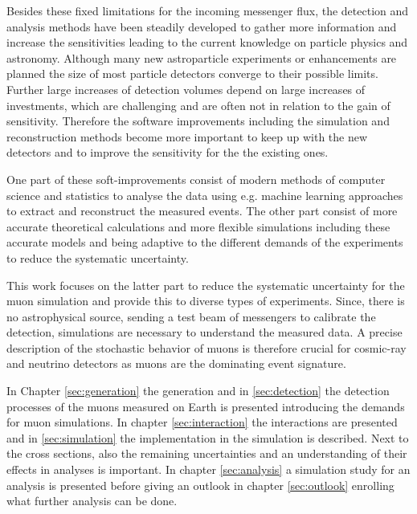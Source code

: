 Besides these fixed limitations for the incoming messenger flux, the detection and analysis methods have been steadily developed to gather more information and increase the sensitivities leading to the current knowledge on particle physics and astronomy.
Although many new astroparticle experiments or enhancements are planned the size of most particle detectors converge to their possible limits.
Further large increases of detection volumes depend on large increases of investments, which are challenging and are often not in relation to the gain of sensitivity.
Therefore the software improvements including the simulation and reconstruction methods become more important to keep up with the new detectors and to improve the sensitivity for the the existing ones.

One part of these soft-improvements consist of modern methods of computer science and statistics to analyse the data using e.g. machine learning approaches to extract and reconstruct the measured events.
The other part consist of more accurate theoretical calculations and more flexible simulations including these accurate models and being adaptive to the different demands of the experiments to reduce the systematic uncertainty.

This work focuses on the latter part to reduce the systematic uncertainty for the muon simulation and provide this to diverse types of experiments.
Since, there is no astrophysical source, sending a test beam of messengers to calibrate the detection, simulations are necessary to understand the measured data.
A precise description of the stochastic behavior of muons is therefore crucial for cosmic-ray and neutrino detectors as muons are the dominating event signature.

In Chapter \ref{sec:generation} the generation and in \ref{sec:detection} the detection processes of the muons measured on Earth is presented introducing the demands for muon simulations.
In chapter \ref{sec:interaction} the interactions are presented and in \ref{sec:simulation} the implementation in the simulation is described.
Next to the cross sections, also the remaining uncertainties and an understanding of their effects in analyses is important.
In chapter \ref{sec:analysis} a simulation study for an analysis is presented before giving an outlook in chapter \ref{sec:outlook} enrolling what further analysis can be done.
